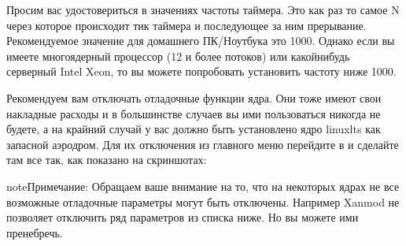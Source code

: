 \documentclass[letterpaper,10pt,russian,openany]{sphinxmanual}
\begin{document}
\sphinxAtStartPar
{}

\noindent{}

\sphinxAtStartPar
{}

\noindent{}

\sphinxAtStartPar
{}

\noindent{}

\sphinxAtStartPar
{}

\noindent{}

\sphinxAtStartPar
{} Просим вас удостовериться в значениях частоты таймера.
Это как раз то самое N через которое происходит тик таймера и последующее за ним прерывание.
Рекомендуемое значение для домашнего ПК/Ноутбука это 1000.
Однако если вы имеете многоядерный процессор (12 и более потоков) или какой\sphinxhyphen{}нибудь серверный Intel Xeon,
то вы можете попробовать установить частоту ниже 1000.

\sphinxAtStartPar
{}

\noindent{}

\sphinxAtStartPar
{}

\noindent{}

\sphinxAtStartPar
{}

\noindent{}

\sphinxAtStartPar
{} Рекомендуем вам отключать отладочные функции ядра. Они тоже имеют свои накладные расходы и в большинстве случаев
вы ими пользоваться никогда не будете, а на крайний случай у вас должно быть установлено ядро linux\sphinxhyphen{}lts как запасной аэродром.
Для их отключения из главного меню перейдите в  и сделайте там все так, как показано на скриншотах:

\begin{sphinxadmonition}{note}{Примечание:}
\sphinxAtStartPar
Обращаем ваше внимание на то, что на некоторых ядрах не все возможные отладочные параметры могут быть отключены.
Например Xanmod не позволяет отключить ряд параметров из списка ниже. Но вы можете ими пренебречь.
\end{sphinxadmonition}
\end{document}
